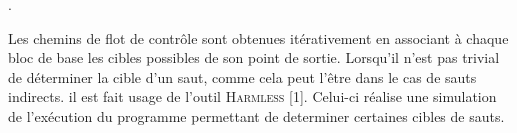 \documentclass[final]{beamer}
\begin{document}
\begin{frame}
\begin{textblock}{39}
\begin{block}{\thesection. \secname}
\begin{itemize}
            Les chemins de flot de contrôle sont obtenues itérativement en
            associant à chaque bloc de base les cibles possibles de son point de
            sortie. Lorsqu’il n’est pas trivial de déterminer la cible d’un
            saut, comme cela peut l’être dans le cas de sauts indirects. il est
            fait usage de l’outil \textsc{Harmless} [1]. Celui-ci réalise une
            simulation de l’exécution du programme permettant de determiner
            certaines cibles de sauts.
        \end{itemize}
        \vspace{.4em}
      \end{block}
      \vspace{2em}



\end{textblock}
\end{frame}
\end{document}
